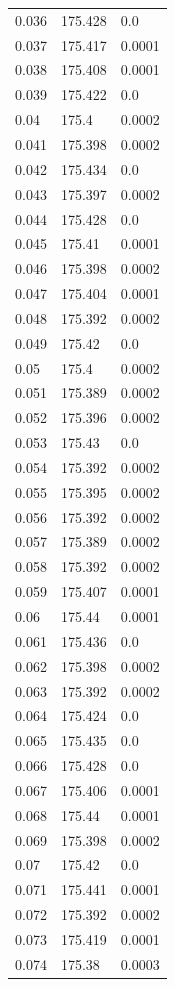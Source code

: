 \begin{table}[H]
\begin{tabular}{lll}
0.036 & 175.428 & 0.0 \\
0.037 & 175.417 & 0.0001 \\
0.038 & 175.408 & 0.0001 \\
0.039 & 175.422 & 0.0 \\
0.04 & 175.4 & 0.0002 \\
0.041 & 175.398 & 0.0002 \\
0.042 & 175.434 & 0.0 \\
0.043 & 175.397 & 0.0002 \\
0.044 & 175.428 & 0.0 \\
0.045 & 175.41 & 0.0001 \\
0.046 & 175.398 & 0.0002 \\
0.047 & 175.404 & 0.0001 \\
0.048 & 175.392 & 0.0002 \\
0.049 & 175.42 & 0.0 \\
0.05 & 175.4 & 0.0002 \\
0.051 & 175.389 & 0.0002 \\
0.052 & 175.396 & 0.0002 \\
0.053 & 175.43 & 0.0 \\
0.054 & 175.392 & 0.0002 \\
0.055 & 175.395 & 0.0002 \\
0.056 & 175.392 & 0.0002 \\
0.057 & 175.389 & 0.0002 \\
0.058 & 175.392 & 0.0002 \\
0.059 & 175.407 & 0.0001 \\
0.06 & 175.44 & 0.0001 \\
0.061 & 175.436 & 0.0 \\
0.062 & 175.398 & 0.0002 \\
0.063 & 175.392 & 0.0002 \\
0.064 & 175.424 & 0.0 \\
0.065 & 175.435 & 0.0 \\
0.066 & 175.428 & 0.0 \\
0.067 & 175.406 & 0.0001 \\
0.068 & 175.44 & 0.0001 \\
0.069 & 175.398 & 0.0002 \\
0.07 & 175.42 & 0.0 \\
0.071 & 175.441 & 0.0001 \\
0.072 & 175.392 & 0.0002 \\
0.073 & 175.419 & 0.0001 \\
0.074 & 175.38 & 0.0003 \\

\end{tabular}
\end{table}
